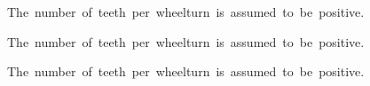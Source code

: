 \documentclass{article}
\begin{document}
\begin{isamarkuptext*}[label=wheel\_ass, label_type=exported\_constraint, attributes={}]%
The\ number\ of\ teeth\ per\ wheelturn\ is\ assumed\ to\ be\ positive.
\end{isamarkuptext*}

\begin{isamarkuptext*}[label=wheel\_ass, attributes={}]%
The\ number\ of\ teeth\ per\ wheelturn\ is\ assumed\ to\ be\ positive.
\end{isamarkuptext*}

\begin{isamarkuptext*}[attributes={foo\_attribute}]%
The\ number\ of\ teeth\ per\ wheelturn\ is\ assumed\ to\ be\ positive.
\end{isamarkuptext*}
\end{document}

